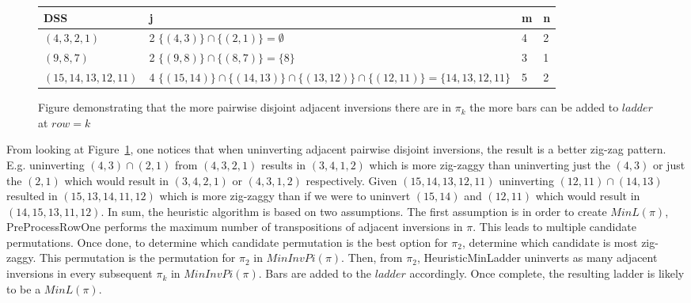 \begin{figure}[t]
    \begin{tabular}{|p{3cm}||p{7cm}||p{1cm}||p{1cm}|}
        \hline 
    DSS & j & m & n \\ 
    \hline
    \small{$(4,3,2,1)$} & 2 $\{(4,3)\} \cap \{(2,1)\} = \emptyset$ & 4 & 2\\
    \hline 
    \small{$(9,8,7)$} & 2 $\{(9,8)\} \cap \{(8,7)\} = \{8\}$ & 3 & 1\\
    \hline 
     \small{$(15,14,13,12,11)$} & 4 $\{(15,14)\} \cap \{(14,13)\} \cap \{(13,12)\} \cap \{(12,11)\} = \{14,13,12,11\}$ & 5 & 2\\
     \hline
    \end{tabular}
    \caption{Figure demonstrating that the more pairwise disjoint adjacent inversions there are in $\pi_{k}$ the more bars can 
    be added to $ladder$ at $row=k$}
    \label{Fig:PairwiseDisjoint}
\end{figure}


From looking at Figure~\ref{Fig:PairwiseDisjoint}, one notices that when uninverting adjacent pairwise disjoint inversions, 
the result is a better zig-zag pattern. E.g. uninverting $(4,3) \cap (2,1)$ from $(4,3,2,1)$ results in $(3,4,1,2)$
which is more zig-zaggy than uninverting just the $(4,3)$ or just the $(2,1)$ which would result in $(3,4,2,1)$ or 
$(4,3,1,2)$ respectively. Given $(15,14,13,12,11)$ uninverting $(12,11) \cap 
(14,13)$ resulted in $(15,13,14,11,12)$ which is more zig-zaggy 
than if we were to uninvert $(15,14)$ and $(12,11)$ which would result in $(14,15,13,11,12)$.
In sum, the heuristic algorithm is based on two assumptions. The first assumption is in order 
to create $MinL(\pi)$, {\sc PreProcessRowOne} performs the maximum number of transpositions 
of adjacent inversions in $\pi$. This leads to multiple candidate permutations.
 Once done, to determine which candidate permutation is the best option 
for $\pi_{2}$, determine which candidate is most zig-zaggy. 
This permutation is the permutation for $\pi_{2}$ in $MinInvPi(\pi)$. Then, from $\pi_{2}$, {\sc HeuristicMinLadder}
uninverts as many adjacent inversions in every subsequent $\pi_{k}$ in $MinInvPi(\pi)$. Bars 
are added to the $ladder$ accordingly. Once complete, the resulting ladder is likely to be a $MinL(\pi)$.





 